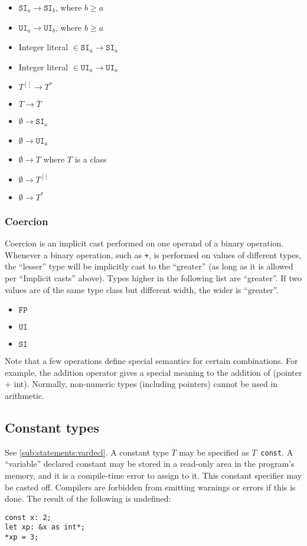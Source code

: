 \documentclass{article}
\newcommand{\R}[1]{\mathtt{#1}}
\begin{document}
\begin{itemize}
\item{$\R{SI}_a \to \R{SI}_b$, where $b \geq a$}
\item{$\R{UI}_a \to \R{UI}_b$, where $b \geq a$}
\item{Integer literal $\in \R{SI}_a \to \R{SI}_a$}
\item{Integer literal $\in \R{UI}_a \to \R{UI}_a$}
\item{$T^{[]} \to T^*$}
\item{$T \to \overline{T}$}
\item{$\emptyset \to \R{SI}_a$}
\item{$\emptyset \to \R{UI}_a$}
\item{$\emptyset \to T$ where $T$ is a class}
\item{$\emptyset \to T^{[]}$}
\item{$\emptyset \to T^*$}
\end{itemize}

\subsubsection{Coercion}
Coercion is an implicit cast performed on one operand of a binary operation.
Whenever a binary operation, such as \texttt{+}, is performed on values of
different types, the ``lesser'' type will be implicitly cast to the
``greater'' (as long as it is allowed per ``Implicit casts'' above).
Types higher in the following list are ``greater''. If two values are of the
same type class but different width, the wider is ``greater''.

\begin{itemize}
\item{$\R{FP}$}
\item{$\R{UI}$}
\item{$\R{SI}$}
\end{itemize}

Note that a few operations define special semantics for certain combinations.
For example, the addition operator gives a special meaning to the addition of
(pointer + int). Normally, non-numeric types (including pointers)
cannot be used in arithmetic.

\subsection{Constant types}
\label{sub:types:const}
See \ref{sub:statements:vardecl}.
A constant type $\overline{T}$ may be specified as $T$~\texttt{const}. A
``variable'' declared constant may be stored in a read-only area in the
program's memory, and it is a compile-time error to assign to it.
This constant specifier may be casted off. Compilers are forbidden from
emitting warnings or errors if this is done. The result of the following
is undefined:
\begin{verbatim}
const x: 2;
let xp: &x as int*;
*xp = 3;
\end{verbatim}
\end{document}
